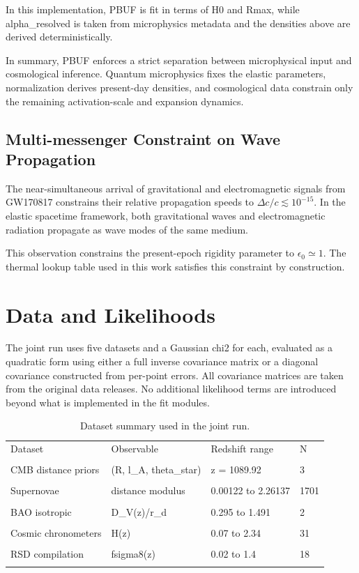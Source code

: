 \documentclass[11pt]{article}
\begin{document}
In this implementation, PBUF is fit in terms of H0 and Rmax, while alpha\_resolved is taken from microphysics metadata and the densities above are derived deterministically.

In summary, PBUF enforces a strict separation between microphysical input and cosmological inference.
Quantum microphysics fixes the elastic parameters, normalization derives present-day densities, and cosmological data constrain only the remaining activation-scale and expansion dynamics.

\subsection{Multi-messenger Constraint on Wave Propagation}

The near-simultaneous arrival of gravitational and electromagnetic signals from GW170817 constrains their relative propagation speeds to \(\Delta c / c \lesssim 10^{-15}\).
In the elastic spacetime framework, both gravitational waves and electromagnetic radiation propagate as wave modes of the same medium.

This observation constrains the present-epoch rigidity parameter to \(\epsilon_0 \simeq 1\).
The thermal lookup table used in this work satisfies this constraint by construction.

\section{Data and Likelihoods}
The joint run uses five datasets and a Gaussian chi2 for each, evaluated as a quadratic form using either a full inverse covariance matrix or a diagonal covariance constructed from per-point errors. All covariance matrices are taken from the original data releases.
No additional likelihood terms are introduced beyond what is implemented in the fit modules.

\begin{table}[ht]
\centering
\begin{tabular}{llll}
\toprule
Dataset & Observable & Redshift range & N \\\\
\midrule
CMB distance priors & (R, l\_A, theta\_star) & z = 1089.92 & 3 \\\\
Supernovae & distance modulus & 0.00122 to 2.26137 & 1701 \\\\
BAO isotropic & D\_V(z)/r\_d & 0.295 to 1.491 & 2 \\\\
Cosmic chronometers & H(z) & 0.07 to 2.34 & 31 \\\\
RSD compilation & fsigma8(z) & 0.02 to 1.4 & 18 \\\\
\bottomrule
\end{tabular}
\caption{Dataset summary used in the joint run.}
\end{table}
\end{document}
